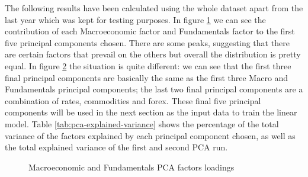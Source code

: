 The following results have been calculated using the whole dataset apart from the last year which was kept for testing purposes.
In figure \ref{fig:factor-contribution-pca1} we can see the contribution of each Macroeconomic factor and Fundamentals factor to the first five principal components chosen. There are some peaks, suggesting that there are certain factors that prevail on the others but overall the distribution is pretty equal.
In figure \ref{fig:factor-contribution-pca2} the situation is quite different: we can see that the first three final principal components are basically the same as the first three Macro and Fundamentals principal components; the last two final principal components are a combination of rates, commodities and forex.
These final five principal components will be used in the next section as the input data to train the linear model.
Table \ref{tab:pca-explained-variance} shows the percentage of the total variance of the factors explained by each principal component chosen, as well as the total explained variance of the first and second PCA run.

\begin{table}[htb]
	\centering
	\caption{Percentages of explained variance for each principal component and the total variance for the first and second PCA run}
	\label{tab:pca-explained-variance}
\end{table} 

\begin{figure}[htb]
	\centering
	
	\caption{Macroeconomic and Fundamentals PCA factors loadings}
	\label{fig:factor-contribution-pca1}
\end{figure}

\begin{figure}[htb]
	\centering
	
	\caption{}
	\label{fig:factor-contribution-pca2}
\end{figure}

